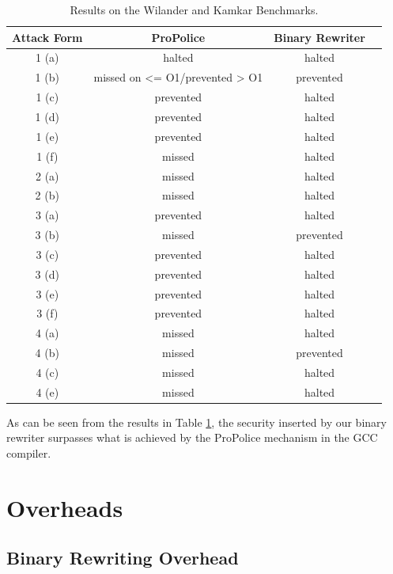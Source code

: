 \begin{table}
\begin{centering}
\begin{tabular}{ |c|c|c|c| }
\hline
\textbf{Attack Form} & \textbf{ProPolice} & \textbf{Binary Rewriter}
\\
\hline
\hline
1 (a) & halted & halted \\
\hline
1 (b) & missed on <= O1/prevented > O1 & prevented \\
\hline
1 (c) & prevented & halted \\
\hline
1 (d) & prevented & halted \\
\hline
1 (e) & prevented & halted \\
\hline
1 (f) & missed & halted \\
\hline
2 (a) & missed & halted \\
\hline
2 (b) & missed & halted \\
\hline
3 (a) & prevented & halted \\
\hline
3 (b) & missed & prevented \\
\hline
3 (c) & prevented & halted \\
\hline
3 (d) & prevented & halted \\
\hline
3 (e) & prevented & halted \\
\hline 
3 (f) & prevented & halted \\
\hline
4 (a) & missed & halted \\
\hline
4 (b) & missed & prevented \\
\hline
4 (c) & missed & halted \\
\hline
4 (e) & missed & halted \\
\hline
\end{tabular}

\par\end{centering}

\caption{Results on the Wilander and Kamkar Benchmarks.}
\label{secresults}

\end{table}

As can be seen from the results in Table \ref{secresults}, the security inserted by our binary
rewriter surpasses what is achieved by the ProPolice mechanism in the GCC compiler.

\section{Overheads}

\subsection{Binary Rewriting Overhead}

